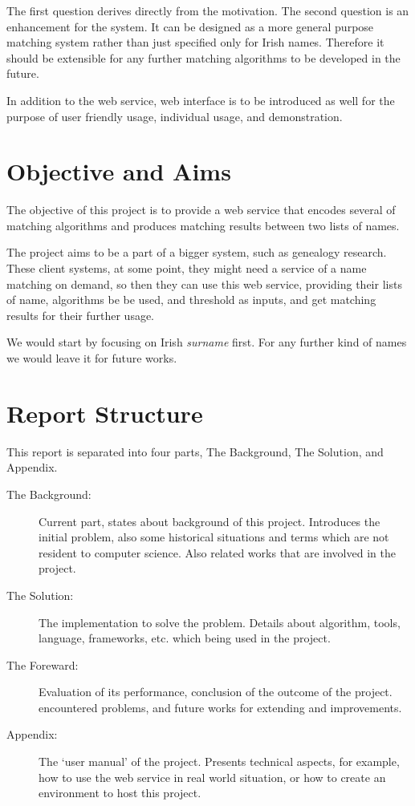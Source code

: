 The first question derives directly from the motivation.
The second question is an enhancement for the system. It can be designed
as a more general purpose matching system rather than just specified
only for Irish names. Therefore it should be extensible for any further
matching algorithms to be developed in the future.

In addition to the web service, web interface is to be introduced as well
for the purpose of user friendly usage, individual usage, and demonstration.

\section{Objective and Aims}
\label{sec:obj}

The objective of this project is to provide a web service that
encodes several of matching algorithms and produces matching
results between two lists of names.

The project aims to be a part of a bigger system, such as
genealogy research. These client systems, at some point,
they might need a service of a name matching on demand, so then they can use this
web service, providing their lists of name, algorithms be be used,
and threshold as inputs, and get matching results for their further usage.

We would start by focusing on Irish \textit{surname} first.
For any further kind of names we would leave it for future works.

\section{Report Structure}

This report is separated into four parts, The Background, The Solution,
and Appendix.

\begin{description}
\item[The Background:]
  Current part, states about background of this project. Introduces
  the initial problem, also some historical situations and terms
  which are not resident to computer science. Also related works
  that are involved in the project.
\item[The Solution:]
  The implementation to solve the problem. Details about algorithm,
  tools, language, frameworks, etc. which being used in the project.
\item[The Foreward:]
  Evaluation of its performance, conclusion of the outcome of the project.
  encountered problems, and future works for extending and improvements.
\item[Appendix:]
  The `user manual' of the project. Presents technical aspects,
  for example, how to use the web service in real world situation,
  or how to create an environment to host this project.
\end{description}
